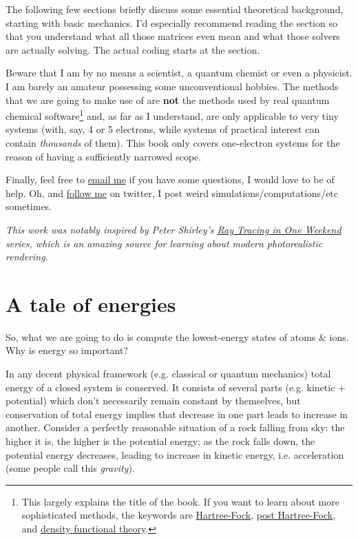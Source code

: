 \documentclass{article}
\begin{document}
The following few sections briefly discuss some essential theoretical background, starting with basic mechanics. I'd especially recommend reading the  section so that you understand what all those matrices even mean and what those solvers are actually solving. The actual coding starts at the  section.

Beware that I am by no means a scientist, a quantum chemist or even a physicist. I am barely an amateur possessing some unconventional hobbies. The methods that we are going to make use of are \textbf{not} the methods used by real quantum chemical software\footnote{This largely explains the title of the book. If you want to learn about more sophisticated methods, the keywords are \href{https://en.wikipedia.org/wiki/Hartree\%E2\%80\%93Fock_method}{Hartree-Fock}, \href{https://en.wikipedia.org/wiki/Post\%E2\%80\%93Hartree\%E2\%80\%93Fock}{post Hartree-Fock}, and \href{https://en.wikipedia.org/wiki/Density_functional_theory}{density functional theory}.} and, as far as I understand, are only applicable to very tiny systems (with, say, 4 or 5 electrons, while systems of practical interest can contain \textit{thousands} of them). This book only covers one-electron systems for the reason of having a sufficiently narrowed scope.

Finally, feel free to \href{mailto:lisyarus@gmail.com}{email me} if you have some questions, I would love to be of help. Oh, and \href{https://twitter.com/lisyarus}{follow me} on twitter, I post weird simulations/computations/etc sometimes.

\bigbreak
\textit{This work was notably inspired by Peter Shirley's \href{https://raytracing.github.io}{Ray Tracing in One Weekend} series, which is an amazing source for learning about modern photorealistic rendering.}

\newpage

\section{A tale of energies}

So, what we are going to do is compute the lowest-energy states of atoms \& ions. Why is energy so important?

In any decent physical framework (e.g. classical or quantum mechanics) total energy of a closed system is conserved. It consists of several parts (e.g. kinetic + potential) which don't necessarily remain constant by themselves, but conservation of total energy implies that decrease in one part leads to increase in another. Consider a perfectly reasonable situation of a rock falling from sky: the higher it is, the higher is the potential energy; as the rock falls down, the potential energy decreases, leading to increase in kinetic energy, i.e. acceleration (some people call this \textit{gravity}).
\end{document}
